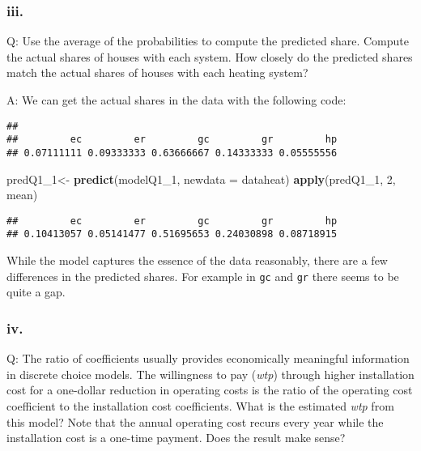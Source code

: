 \documentclass[
]{article}
\newenvironment{Shaded}{\begin{snugshade}}{\end{snugshade}}
\newcommand{\DataTypeTok}[1]{\textcolor[rgb]{0.13,0.29,0.53}{#1}}
\newcommand{\DecValTok}[1]{\textcolor[rgb]{0.00,0.00,0.81}{#1}}
\newcommand{\KeywordTok}[1]{\textcolor[rgb]{0.13,0.29,0.53}{\textbf{#1}}}
\newcommand{\NormalTok}[1]{#1}
\newcommand{\OperatorTok}[1]{\textcolor[rgb]{0.81,0.36,0.00}{\textbf{#1}}}
\newcommand{\StringTok}[1]{\textcolor[rgb]{0.31,0.60,0.02}{#1}}
\begin{document}
\hypertarget{iii.}{%
\subsubsection{iii.}\label{iii.}}

Q: Use the average of the probabilities to compute the predicted share.
Compute the actual shares of houses with each system. How closely do the
predicted shares match the actual shares of houses with each heating
system?

A: We can get the actual shares in the data with the following code:

\begin{Shaded}
\end{Shaded}

\begin{verbatim}
## 
##         ec         er         gc         gr         hp 
## 0.07111111 0.09333333 0.63666667 0.14333333 0.05555556
\end{verbatim}

\begin{Shaded}
\begin{Highlighting}[]
\NormalTok{predQ1_}\DecValTok{1}\NormalTok{<-}\StringTok{ }\KeywordTok{predict}\NormalTok{(modelQ1_}\DecValTok{1}\NormalTok{, }\DataTypeTok{newdata =}\NormalTok{ dataheat)}
\KeywordTok{apply}\NormalTok{(predQ1_}\DecValTok{1}\NormalTok{, }\DecValTok{2}\NormalTok{, mean)}
\end{Highlighting}
\end{Shaded}

\begin{verbatim}
##         ec         er         gc         gr         hp 
## 0.10413057 0.05141477 0.51695653 0.24030898 0.08718915
\end{verbatim}

While the model captures the essence of the data reasonably, there are a
few differences in the predicted shares. For example in \texttt{gc} and
\texttt{gr} there seems to be quite a gap.

\hypertarget{iv.}{%
\subsubsection{iv.}\label{iv.}}

Q: The ratio of coefficients usually provides economically meaningful
information in discrete choice models. The willingness to pay
(\emph{wtp}) through higher installation cost for a one-dollar reduction
in operating costs is the ratio of the operating cost coefficient to the
installation cost coefficients. What is the estimated \emph{wtp} from
this model? Note that the annual operating cost recurs every year while
the installation cost is a one-time payment. Does the result make sense?
\end{document}
